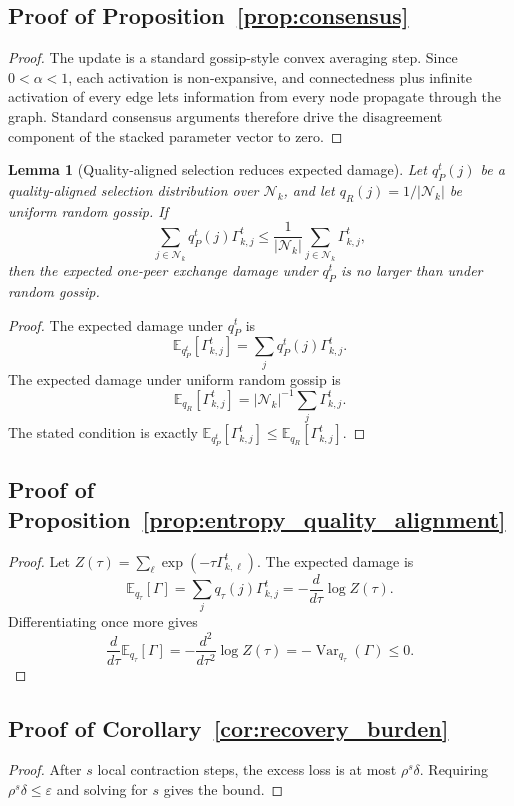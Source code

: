\documentclass[conference]{IEEEtran}
\newtheorem{lemma}{Lemma}
\begin{document}
\subsection{Proof of Proposition~\ref{prop:consensus}}
\begin{proof}
The update is a standard gossip-style convex averaging step. Since \(0<\alpha<1\), each activation is non-expansive, and connectedness plus infinite activation of every edge lets information from every node propagate through the graph. Standard consensus arguments therefore drive the disagreement component of the stacked parameter vector to zero.
\end{proof}

\begin{lemma}[Quality-aligned selection reduces expected damage]
\label{lem:quality_aligned_damage}
Let \(q_P^t(j)\) be a quality-aligned selection distribution over \(\mathcal{N}_k\), and let \(q_R(j)=1/|\mathcal{N}_k|\) be uniform random gossip. If
\[
\sum_{j\in\mathcal{N}_k}
q_P^t(j)\Gamma_{k,j}^t
\leq
\frac{1}{|\mathcal{N}_k|}
\sum_{j\in\mathcal{N}_k}
\Gamma_{k,j}^t,
\]
then the expected one-peer exchange damage under \(q_P^t\) is no larger than under random gossip.
\end{lemma}

\begin{proof}
The expected damage under \(q_P^t\) is
\[
\mathbb{E}_{q_P^t}[\Gamma_{k,j}^t]
=
\sum_j q_P^t(j)\Gamma_{k,j}^t .
\]
The expected damage under uniform random gossip is
\[
\mathbb{E}_{q_R}[\Gamma_{k,j}^t]
=
|\mathcal{N}_k|^{-1}\sum_j\Gamma_{k,j}^t .
\]
The stated condition is exactly \(\mathbb{E}_{q_P^t}[\Gamma_{k,j}^t]\leq \mathbb{E}_{q_R}[\Gamma_{k,j}^t]\).
\end{proof}

\subsection{Proof of Proposition~\ref{prop:entropy_quality_alignment}}
\begin{proof}
Let \(Z(\tau)=\sum_{\ell}\exp(-\tau \Gamma_{k,\ell}^t)\). The expected damage is
\[
\mathbb{E}_{q_\tau}[\Gamma]
=
\sum_j q_\tau(j)\Gamma_{k,j}^t
=
-
\frac{d}{d\tau}\log Z(\tau).
\]
Differentiating once more gives
\[
\frac{d}{d\tau}\mathbb{E}_{q_\tau}[\Gamma]
=
-
\frac{d^2}{d\tau^2}\log Z(\tau)
=
-
\operatorname{Var}_{q_\tau}(\Gamma)
\leq0 .
\]
\end{proof}

\subsection{Proof of Corollary~\ref{cor:recovery_burden}}
\begin{proof}
After \(s\) local contraction steps, the excess loss is at most \(\rho^s\delta\). Requiring \(\rho^s\delta\leq\varepsilon\) and solving for \(s\) gives the bound.
\end{proof}
\end{document}

